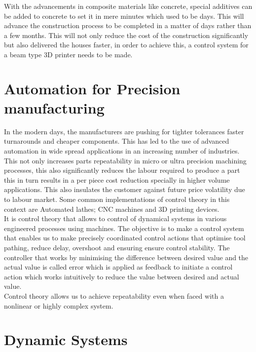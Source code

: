 \documentclass{UoNMCHA}
\numberwithin{equation}{section}
\begin{document}
With the advancements in composite materials like concrete, special additives can be added to concrete to set it in mere minutes which used to be days. This will advance the construction process to be completed in a matter of days rather than a few months. This will not only reduce the cost of the construction significantly but also delivered the houses faster, in order to achieve this, a control system for a beam type 3D printer needs to be made.

\section{Automation for Precision manufacturing}\label{Automation for Precision manufacturing}

In the modern days, the manufacturers are pushing for tighter tolerances faster turnarounds and cheaper components. This has led to the use of advanced automation in wide spread applications in an increasing number of industries. This not only increases parts repeatability in micro or ultra precision machining processes, this also significantly reduces the labour required to produce a part this in turn results in a per piece cost reduction specially in higher volume applications. This also insulates the customer against future price volatility due to labour market. Some common implementations of control theory in this context are Automated lathes; CNC machines and 3D printing devices. \\

It is control theory that allows to control of dynamical systems in various engineered processes using machines. The objective is to make a control system that enables us to make precisely coordinated control actions that optimise tool pathing, reduce delay, overshoot and ensuring ensure control stability. The controller that works by minimising the difference between desired value and the actual value is called error which is applied as feedback to initiate a control action which works intuitively to reduce the value between desired and actual value. \\

Control theory allows us to achieve repeatability even when faced with a nonlinear or highly complex system. 

\section{Dynamic Systems}\label{Dynamic Systems}
\end{document}
